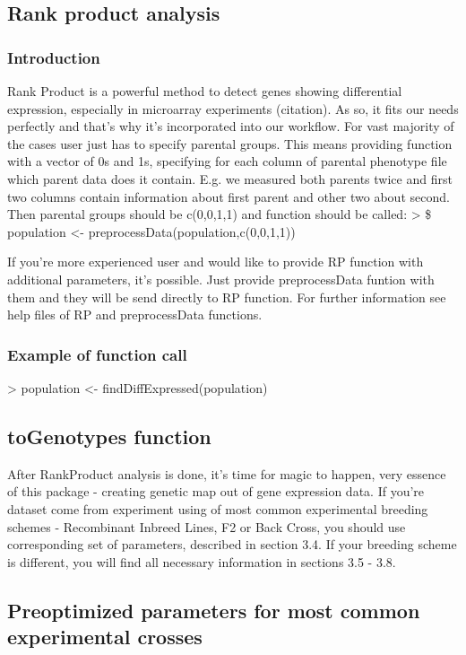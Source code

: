 \documentclass{article}
\begin{document}
\subsection{Rank product analysis}
\subsubsection{Introduction}
Rank Product \citep{Hong:2006} is a powerful method to detect genes showing differential expression, especially in microarray experiments (citation). As so, it fits our needs perfectly and that's why it's incorporated into our workflow. For vast majority of the cases user just has to specify parental groups. This means providing function with a vector of 0s and 1s, specifying for each column of parental phenotype file which parent data does it contain. E.g. we measured both parents twice and first two columns contain information about first parent and other two about second. Then parental groups should be c(0,0,1,1) and function should be called: >  \$ population <- preprocessData(population,c(0,0,1,1))

{\noindent}If you're more experienced user and would like to provide RP function with additional parameters, it's possible. Just provide preprocessData funtion with them and they will be send directly to RP function. For further information see help files of RP and preprocessData functions.
\subsubsection{Example of function call}
\begin{Schunk}
\begin{Sinput}
> population <- findDiffExpressed(population)
\end{Sinput}
\end{Schunk}
\subsection{toGenotypes function}
After RankProduct analysis is done, it's time for magic to happen,  very essence of this package - creating genetic map out of gene expression data. If you're dataset come from experiment using of most common experimental breeding schemes - Recombinant Inbreed Lines, F2 or Back Cross, you should use corresponding set of parameters, described in section 3.4. If your breeding scheme is different, you will find all necessary information in sections 3.5 - 3.8.
\subsection{Preoptimized parameters for most common experimental crosses}
\end{document}
